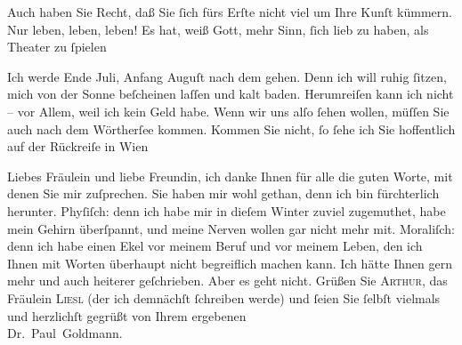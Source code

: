 \pstart
           Auch haben Sie Recht, daß Sie{ }ſich fürs Erſte nicht viel um Ihre Kunſt kümmern. Nur
               leben, leben, leben! Es hat, weiß Gott, mehr Sinn,{ }ſich lieb zu haben, als Theater zu{ }ſpielen{\dotsfive}\pend
           
\pstart
           Ich werde Ende Juli, Anfang Auguſt nach dem \label{K_L03528-2v}\label{K_L03528-2}{ }{\pb}gehen. Denn ich will ruhig{ }ſitzen, mich von der
               Sonne beſcheinen laſſen und kalt baden. Herumreiſen kann ich nicht – vor Allem, weil
               ich kein Geld habe. Wenn wir uns alſo{ }ſehen wollen, müſſen Sie auch nach dem Wörtherſee kommen. Kommen Sie nicht,{ }ſo{ }ſehe ich
               Sie hoffentlich auf der Rückreiſe in Wien\pend
           
\pstart
           Liebes Fräulein und liebe Freundin, ich danke Ihnen für alle die guten Worte, mit
               denen Sie mir zuſprechen. Sie haben mir wohl gethan, denn ich bin fürchterlich
               herunter. {\pb}Phyſiſch: denn ich habe mir in dieſem
               Winter zuviel zugemuthet, habe mein Gehirn überſpannt, und meine Nerven wollen gar
               nicht mehr mit. Moraliſch: denn ich habe einen Ekel vor meinem Beruf und vor meinem
               Leben, den ich Ihnen mit Worten überhaupt nicht begreiflich machen kann. Ich hätte
               Ihnen gern mehr und auch heiterer geſchrieben. Aber es geht nicht. Grüßen Sie \textsc{Arthur}, das Fräulein \textsc{Liesl} (der ich demnächſt{ }ſchreiben werde) und{ }ſeien Sie{ }ſelbſt vielmals und
               herzlichſt gegrüßt von Ihrem ergebenen {\\}\spacefill\mbox{Dr. Paul Goldmann.}\pend
           \endnumbering{}  \newcommand{\dateiname}{L03528}\newcommand{\titel}{Paul Goldmann an Olga Gussmann, 28. 5. [1901]}\newcommand{\editorInnen}{Martin Anton Müller und Laura Untner}
